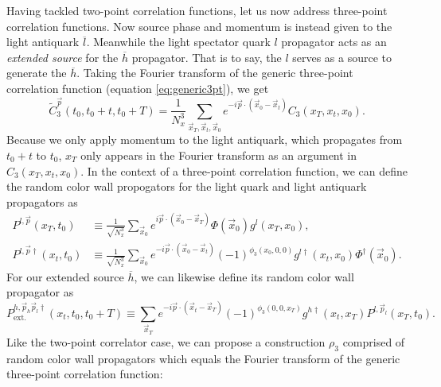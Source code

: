 Having tackled two-point correlation functions, let us now address three-point correlation functions. Now source phase and momentum is instead given to the light antiquark $\overline{l}$.  Meanwhile the light spectator quark $l$ propagator acts as an \textit{extended source} for the $\overline{h}$ propagator.  That is to say, the $l$ serves as a source to generate the $\overline{h}$.  Taking the Fourier transform of the generic three-point correlation function (equation \ref{eq:generic3pt}), we get
\begin{equation}\label{eq:3ptFourier_transform}
    \tilde{C}^{\vec{p}}_3(t_0,t_0+t,t_0+T) = \frac{1}{N^3_x} \sum_{\vec{x}_T,\vec{x}_t, \vec{x}_0} e^{-i\vec{p}\cdot(\vec{x}_0-\vec{x}_t)}C_3(x_T,x_t,x_0).
\end{equation}
Because we only apply momentum to the light antiquark, which propagates from $t_0+t$ to $t_0$, $x_T$ only appears in the Fourier transform as an argument in $C_3(x_T,x_t,x_0)$.  In the context of a three-point correlation function, we can define the random color wall propogators for the light quark and light antiquark propagators as
\begin{align}\label{eq:3ptcolorwall_pt1}
    P^{l,\vec{p}}(x_T, t_0) &\equiv \frac{1}{\sqrt{N^3_x}} \sum_{\vec{x}_0}e^{i\vec{p}\cdot(\vec{x}_0 - \vec{x}_T)}\Phi(\vec{x}_0)g^l(x_T,x_0),\\
    \label{eq:3ptcolorwall_pt2}
    P^{l,\vec{p}\dagger}(x_t, t_0) &\equiv \frac{1}{\sqrt{N^3_x}} \sum_{\vec{x}_0}e^{-i\vec{p}\cdot(\vec{x}_0 - \vec{x}_t)}(-1)^{\phi_3(x_0,0,0)}g^{l\dagger}(x_t,x_0)\Phi^\dagger(\vec{x}_0).
\end{align}
For our extended source $\overline{h}$, we can likewise define its random color wall propagator as
\begin{equation}\label{eq:3ptcolorwall_pt3}
    P_{\mathrm{ext.}}^{h,\vec{p}_h\vec{p}_l\dagger}(x_t, t_0,t_0+T) \equiv \sum_{\vec{x}_T}e^{-i\vec{p}\cdot(\vec{x}_t - \vec{x}_T)}(-1)^{\phi_3(0,0,x_T)}g^{h\dagger}(x_t,x_T)P^{l,\vec{p}_l}(x_T, t_0).
\end{equation}
Like the two-point correlator case, we can propose a construction $\rho_3$ comprised of random color wall propagators which equals the Fourier transform of the generic three-point correlation function:
